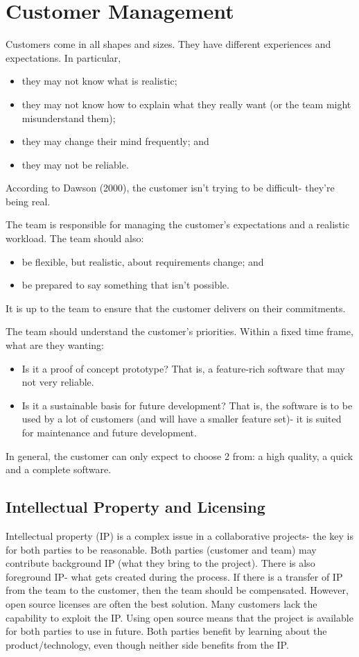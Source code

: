\documentclass[a4paper, openany]{memoir}
\begin{document}
\chapter{Customer Management}
Customers come in all shapes and sizes. They have different experiences and expectations. In particular,
\begin{itemize}
    \item they may not know what is realistic;
    \item they may not know how to explain what they really want (or the team might misunderstand them);
    \item they may change their mind frequently; and
    \item they may not be reliable.
\end{itemize}
According to Dawson (2000), the customer isn't trying to be difficult- they're being real. 

The team is responsible for managing the customer's expectations and a realistic workload. The team should also:
\begin{itemize}
    \item be flexible, but realistic, about requirements change; and
    \item be prepared to say something that isn't possible.
\end{itemize}
It is up to the team to ensure that the customer delivers on their commitments.

The team should understand the customer's priorities. Within a fixed time frame, what are they wanting:
\begin{itemize}
    \item Is it a proof of concept prototype? That is, a feature-rich software that may not very reliable.
    \item Is it a sustainable basis for future development? That is, the software is to be used by a lot of customers (and will have a smaller feature set)- it is suited for maintenance and future development.
\end{itemize}
In general, the customer can only expect to choose 2 from: a high quality, a quick and a complete software.

\section{Intellectual Property and Licensing}
Intellectual property (IP) is a complex issue in a collaborative projects- the key is for both parties to be reasonable. Both parties (customer and team) may contribute background IP (what they bring to the project). There is also foreground IP- what gets created during the process. If there is a transfer of IP from the team to the customer, then the team should be compensated. However, open source licenses are often the best solution. Many customers lack the capability to exploit the IP. Using open source means that the project is available for both parties to use in future. Both parties benefit by learning about the product/technology, even though neither side benefits from the IP.
\end{document}
